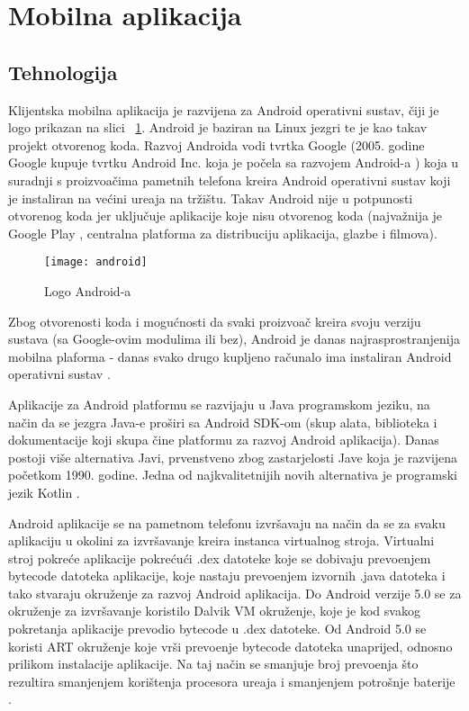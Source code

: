 \section{Mobilna aplikacija}

\subsection{Tehnologija}
Klijentska mobilna aplikacija je razvijena za Android operativni sustav, \v{c}iji je logo prikazan na slici ~\ref{fig:android}. Android je baziran na Linux jezgri te je kao takav projekt otvorenog koda. Razvoj Androida vodi tvrtka Google (2005. godine Google kupuje tvrtku Android Inc. koja je po\v{c}ela sa razvojem Android-a \cite{kupnjaAndroida}) koja u suradnji s proizvo\dj a\v{c}ima pametnih telefona kreira Android operativni sustav koji je instaliran na ve\'{c}ini ure\dj aja na tr\v{z}i\v{s}tu.
Takav Android nije u potpunosti otvorenog koda jer uklju\v{c}uje aplikacije koje nisu otvorenog koda (najva\v{z}nija je Google Play \cite{googlePlay}, centralna platforma za distribuciju aplikacija, glazbe i filmova).

\begin{figure}[!htbp]
	\begin{center}
 \texttt{[image: android]}
 \caption{Logo Android-a}
 \label{fig:android}
	\end{center}
\end{figure}

Zbog otvorenosti koda i mogu\'{c}nosti da svaki proizvo\dj a\v{c} kreira svoju verziju sustava (sa Google-ovim modulima ili bez), Android je danas najrasprostranjenija mobilna plaforma - danas svako drugo kupljeno ra\v{c}unalo ima instaliran Android operativni sustav \cite{androidDominacija}.

Aplikacije za Android platformu se razvijaju u Java programskom jeziku, na na\v{c}in da se jezgra Java-e pro\v{s}iri sa Android SDK-om (skup alata, biblioteka i dokumentacije koji skupa \v{c}ine platformu za razvoj Android aplikacija). Danas postoji vi\v{s}e alternativa Javi, prvenstveno zbog zastarjelosti Jave koja je razvijena po\v{c}etkom 1990. godine. Jedna od najkvalitetnijih novih alternativa je programski jezik Kotlin \cite{kotlin}. 

Android aplikacije se na pametnom telefonu izvr\v{s}avaju na na\v{c}in da se za svaku aplikaciju u okolini za izvr\v{s}avanje kreira instanca virtualnog stroja. 
Virtualni stroj pokre\'{c}e aplikacije pokre\'{c}u\'{c}i .dex datoteke koje se dobivaju prevo\dj enjem bytecode datoteka aplikacije, koje nastaju prevo\dj enjem izvornih .java datoteka i tako stvaraju okru\v{z}enje za razvoj Android aplikacija. Do Android verzije 5.0 se za okru\v{z}enje za izvr\v{s}avanje koristilo Dalvik VM okru\v{z}enje, koje je kod svakog pokretanja aplikacije prevodio bytecode u .dex datoteke. Od Android 5.0 se koristi ART okru\v{z}enje koje vr\v{s}i prevo\dj enje bytecode datoteka unaprijed, odnosno prilikom instalacije aplikacije. Na taj na\v{c}in se smanjuje broj prevo\dj enja \v{s}to rezultira smanjenjem kori\v{s}tenja procesora ure\dj aja i smanjenjem potro\v{s}nje baterije \cite{dalvikArt}.



